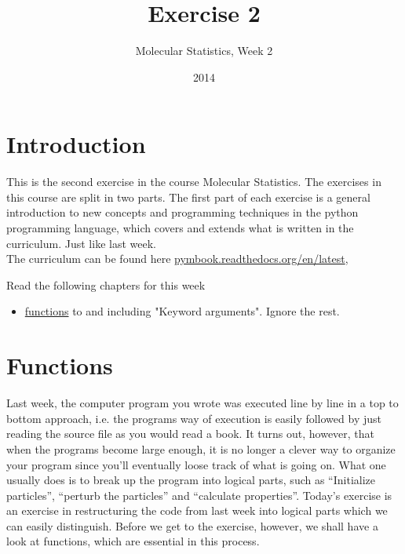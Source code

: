 \documentclass{article}
\title{Exercise 2}
\author{Molecular Statistics, Week 2}
\date{2014}
\begin{document}

\maketitle

\section{Introduction}

This is the second exercise in the course Molecular Statistics.
%
The exercises
in this course are split in two parts. The first part of each exercise is a
general introduction to new concepts and programming techniques in the python
programming language, which covers and extends what is written in the
curriculum.
Just like last week.\\

The curriculum can be found here 
\href{http://pymbook.readthedocs.org/en/latest/}{pymbook.readthedocs.org/en/latest},

Read the following chapters for this week

\begin{itemize}
    \item \href{http://pymbook.readthedocs.org/en/latest/functions.html}{functions} 
          \newline to and including "Keyword arguments". Ignore the rest.
\end{itemize}


\section{Functions}

Last week, the computer program you wrote was executed line by line in a top to
bottom approach, i.e. the programs way of execution is easily followed by just
reading the source file as you would read a book. It turns out, however, that
when the programs become large enough, it is no longer a clever way to organize
your program since you'll eventually loose track of what is going on. What one
usually does is to break up the program into logical parts, such as “Initialize
particles”, “perturb the particles” and “calculate properties”. Today's
exercise is an exercise in restructuring the code
from last week into logical parts which we can easily distinguish. Before we
get to the exercise, however, we shall have a look at functions, which are
essential in this process.\\
\end{document}
